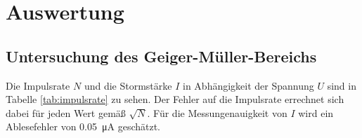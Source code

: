 \section{Auswertung}






\subsection{Untersuchung des Geiger-Müller-Bereichs}

Die Impulsrate $N$ und die Stormstärke $I$ in Abhängigkeit der Spannung $U$ sind in Tabelle \ref{tab:impulsrate} zu sehen.
Der Fehler auf die Impulsrate errechnet sich dabei für jeden Wert gemäß $\sqrt{N}$. %
Für die Messungenauigkeit von $I$ wird ein Ablesefehler von \qty[]{0.05}{\micro\ampere} geschätzt.


